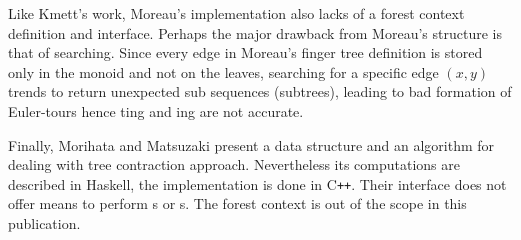 Like Kmett's work, Moreau's implementation also lacks of a forest context definition and interface. Perhaps the major  drawback from Moreau's structure is that of searching. Since every edge in Moreau's finger tree definition is stored only in the monoid and not on the leaves, searching for a specific edge $(x,y)$ trends to return unexpected sub sequences (subtrees), leading to bad formation of Euler-tours hence {\cut}ting and {\link}ing are not accurate.

Finally, Morihata and Matsuzaki \cite{TreeContraction} present a data structure and an algorithm for dealing with tree contraction approach. Nevertheless its computations are described in Haskell, the implementation is done in C\texttt{++}. Their interface does not offer means to perform {\link}s or {\cut}s. The forest context is out of the scope in this publication.